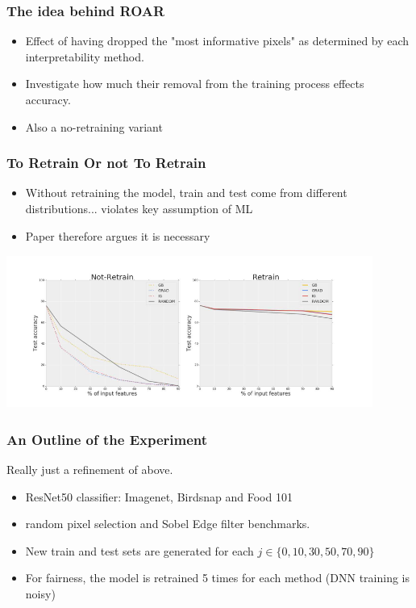\documentclass{beamer}
\theoremstyle{mystyle}
\begin{document}
\begin{frame}
	\frametitle{The idea behind ROAR}
	\begin{itemize}
		\item Effect of having dropped the "most informative pixels" as determined by each interpretability method.
		\item Investigate how much their removal from the training process effects accuracy.		
		\item Also a no-retraining variant
	\end{itemize}
\end{frame}
\begin{frame}
	\frametitle{To Retrain Or not To Retrain}
	\begin{itemize}
	\item Without retraining the model, train and test come from different distributions... violates key assumption of ML \pause
	\item Paper therefore argues it is necessary \pause
	\end{itemize}
	\includegraphics[width=12cm, height=5cm]{retrain_vs_not.png}
\end{frame}
\begin{frame}
	\frametitle{An Outline of the Experiment}
	Really just a refinement of above.
	\begin{itemize}
		\item ResNet50 classifier: Imagenet, Birdsnap and Food 101\pause
		\item random pixel selection and Sobel Edge filter benchmarks.\pause
		\item  New train and test sets are generated for each $j \in \{0,10,30,50,70,90\} $\pause
		\item For fairness, the model is retrained 5 times for each method (DNN training is noisy) \pause
	\end{itemize}
\end{frame}
\end{document}
